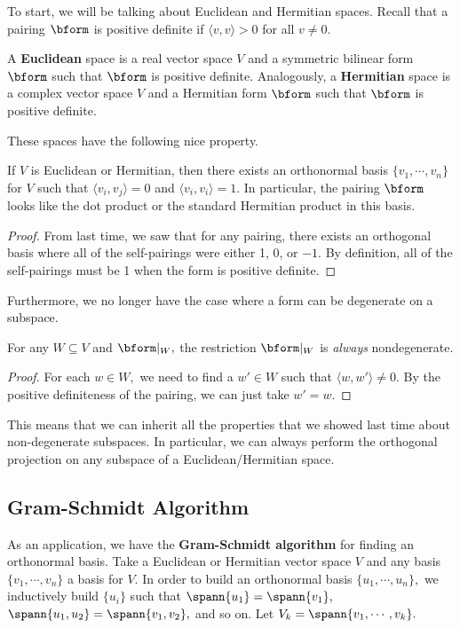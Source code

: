To start, we will be talking about Euclidean and Hermitian spaces. Recall that a pairing $\bform$ is positive definite if $\langle v, v \rangle >0$ for all $v \neq 0.$
\begin{definition}
A \textbf{Euclidean} space is a real vector space $V$ and a symmetric bilinear form $\bform$ such that $\bform$ is positive definite. Analogously, a \textbf{Hermitian} space is a complex vector space $V$ and a Hermitian form $\bform$ such that $\bform$ is positive definite.
\end{definition}

These spaces have the following nice property.
\begin{theorem}
If $V$ is Euclidean or Hermitian, then there exists an orthonormal basis $\{v_1, \cdots, v_n \}$ for $V$ such that $\langle v_i, v_j \rangle = 0$ and $\langle v_i, v_i \rangle = 1$. In particular, the pairing $\bform$ looks like the dot product or the standard Hermitian product in this basis. 
\end{theorem} 
\begin{proof}
    From last time, we saw that for any pairing, there exists an orthogonal basis where all of the self-pairings were either 1, 0, or $-1.$
    By definition, all of the self-pairings must be 1 when the form is positive definite.
\end{proof}
Furthermore, we no longer have the case where a form can be degenerate on a subspace. 
\begin{claim}
    For any $W \subseteq V$ and $\bform|_W,$ the restriction $\bform|_W$ is \emph{always} nondegenerate. 
\end{claim}
\begin{proof}
For each $w \in W,$ we need to find a $w' \in W$ such that $\langle w, w'\rangle \neq 0$. By the positive definiteness of the pairing, we can just take $w' = w.$ 
\end{proof}
This means that we can inherit all the properties that we showed last time about non-degenerate subspaces. 
In particular, we can always perform the orthogonal projection on any subspace of a Euclidean/Hermitian space.

\subsection{Gram-Schmidt Algorithm}
As an application, we have the \textbf{Gram-Schmidt algorithm} for finding an orthonormal basis. 
Take a Euclidean or Hermitian vector space $V$ and any basis $\{v_1, \cdots, v_n\}$ a basis for $V.$ In order to build an orthonormal basis $\{u_1, \cdots, u_n\},$ we inductively build $\{u_i\}$ such that $\spann\{u_1\} = \spann\{v_1\},$ $\spann\{u_1, u_2\} = \spann\{v_1, v_2\},$ and so on. Let $V_k = \spann\{v_1, \cdots, v_k\}.$

